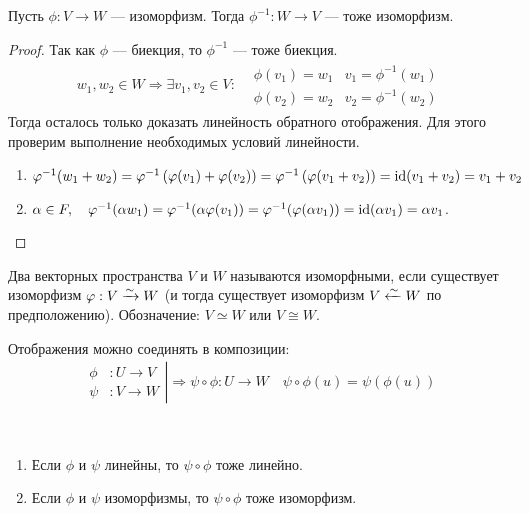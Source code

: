 \begin{Suggestion}
Пусть $\phi: V \rightarrow W$ --- изоморфизм. Тогда $\phi^{-1}: W \rightarrow V$ --- тоже изоморфизм.
\end{Suggestion}
\begin{proof}
Так как $\phi$ --- биекция, то $\phi^{-1}$ --- тоже биекция.
\begin{gather*}
w_1, w_2 \in W \Rightarrow \exists v_1, v_2 \in V:
\begin{aligned} 
&\phi(v_1) = w_1 & v_1 = \phi^{-1}(w_1)\\ 
&\phi(v_2) = w_2 & v_2 = \phi^{-1}(w_2)
\end{aligned} 
\end{gather*}
Тогда осталось только доказать линейность обратного отображения. Для этого проверим выполнение необходимых условий линейности.
\begin{enumerate}
\item $ \varphi^{-1}(w_1 + w_2) = \varphi^{-1}\left(\varphi(v_1) + \varphi(v_2)\right) = \varphi^{-1}\left(\varphi(v_1 + v_2)\right) = \mathrm{id} (v_1 + v_2) = v_1 + v_2$
\item $\alpha \in F, \quad \varphi^{-1}(\alpha w_1) = \varphi^{-1}(\alpha\varphi(v_1)) = \varphi^{-1}(\varphi(\alpha v_1)) = \mathrm{id} (\alpha v_1) = \alpha v_1$.
\end{enumerate}
\end{proof}

\begin{Def}
Два векторных пространства $V$ и $W$ называются изоморфными, если существует изоморфизм $\varphi: V \xrightarrow{\sim} W$ (и тогда существует изоморфизм $V \xleftarrow{\sim} W$ по предположению). Обозначение: $V \simeq W$ или $V \cong W$.
\end{Def}

Отображения можно соединять в композиции:
\begin{gather*}
\left.
\begin{aligned}
\phi&: U \rightarrow V \\
\psi&: V \rightarrow W
\end{aligned}
\right|\Rightarrow \psi \circ \phi : U \rightarrow W \quad \psi \circ \phi(u) = \psi(\phi(u))
\end{gather*}

\begin{Suggestion}\ 
\begin{enumerate}
\item Если $\phi$ и $\psi$ линейны, то $\psi \circ \phi$ тоже линейно.
\item Если $\phi$ и $\psi$ изоморфизмы, то $\psi \circ \phi$ тоже изоморфизм.
\end{enumerate}
\end{Suggestion}


